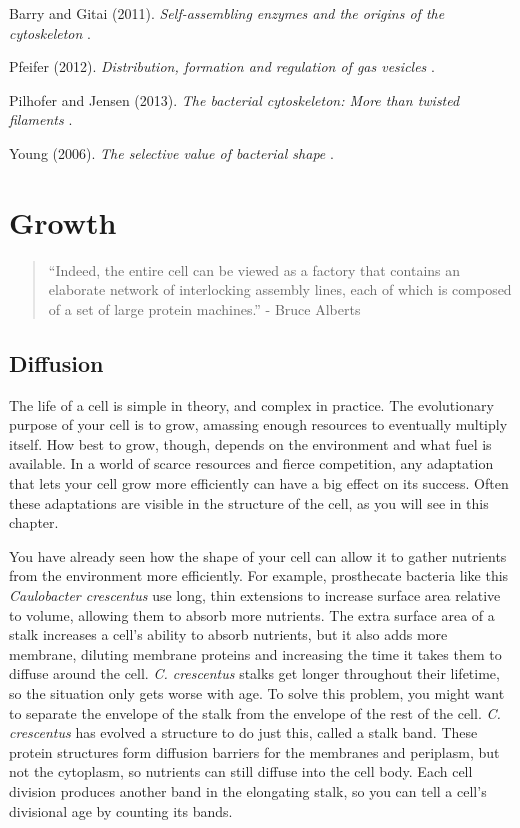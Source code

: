 \documentclass[]{tufte-book}
\begin{document}
Barry and Gitai (2011). \emph{Self-assembling enzymes and the origins of the cytoskeleton} \citep{barry2011}.

Pfeifer (2012). \emph{Distribution, formation and regulation of gas vesicles} \citep{pfeifer2012}.

Pilhofer and Jensen (2013). \emph{The bacterial cytoskeleton: More than twisted filaments} \citep{pilhofer2013}.

Young (2006). \emph{The selective value of bacterial shape} \citep{young2006}.

\hypertarget{growth}{%
\chapter{Growth}\label{growth}}

\begin{quote}
``Indeed, the entire cell can be viewed as a factory that contains an elaborate network of interlocking assembly lines, each of which is composed of a set of large protein machines.''
- Bruce Alberts \citep{alberts1998}
\end{quote}

\hypertarget{diffusion}{%
\section{Diffusion}\label{diffusion}}

The life of a cell is simple in theory, and complex in practice. The evolutionary purpose of your cell is to grow, amassing enough resources to eventually multiply itself. How best to grow, though, depends on the environment and what fuel is available. In a world of scarce resources and fierce competition, any adaptation that lets your cell grow more efficiently can have a big effect on its success. Often these adaptations are visible in the structure of the cell, as you will see in this chapter.

You have already seen how the shape of your cell can allow it to gather nutrients from the environment more efficiently. For example, prosthecate bacteria like this \emph{Caulobacter crescentus} use long, thin extensions to increase surface area relative to volume, allowing them to absorb more nutrients. The extra surface area of a stalk increases a cell's ability to absorb nutrients, but it also adds more membrane, diluting membrane proteins and increasing the time it takes them to diffuse around the cell. \emph{C. crescentus} stalks get longer throughout their lifetime, so the situation only gets worse with age. To solve this problem, you might want to separate the envelope of the stalk from the envelope of the rest of the cell. \emph{C. crescentus} has evolved a structure to do just this, called a stalk band. These protein structures form diffusion barriers for the membranes and periplasm, but not the cytoplasm, so nutrients can still diffuse into the cell body. Each cell division produces another band in the elongating stalk, so you can tell a cell's divisional age by counting its bands.
\end{document}
